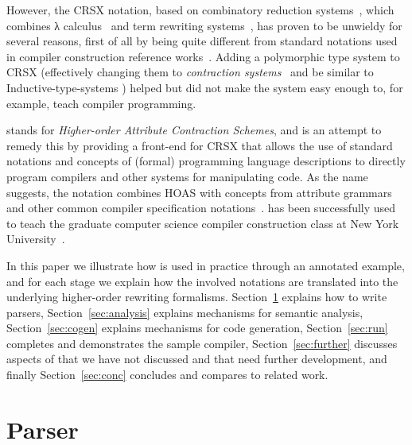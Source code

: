 \documentclass[letterpaper]{llncs}
\begin{document}
However, the CRSX notation, based on combinatory reduction systems~\cite{Klop:1980,Klop+:tcs1993},
which combines λ calculus~\cite{Church:1941,Barendregt:1984} and term rewriting
systems~\cite{Klop:1992:Handbook}, has proven to be unwieldy for several reasons, first of all by
being quite different from standard notations used in compiler construction reference
works~\cite{Aho+:2006}. Adding a polymorphic type system to CRSX (effectively changing them to
\emph{contraction systems}~\cite{Aczel:1978} and be similar to Inductive-type-systems
\cite{BlanquiJouannaudOkada:tcs2002}) helped but did not make the system easy enough to, for
example, teach compiler programming.

\HAX stands for \emph{Higher-order Attribute Contraction Schemes}, and is an attempt to remedy this
by providing a front-end for CRSX that allows the use of standard notations and concepts of (formal)
programming language descriptions to directly program compilers and other systems for manipulating
code. As the name suggests, the notation combines HOAS with concepts from attribute
grammars~\cite{Knuth:mst1968} and other common compiler specification
notations~\cite{Aho+:2006}. \HAX has been successfully used to teach the graduate computer science
compiler construction class at New York University~\cite{RoseRose:cims2015}.

In this paper we illustrate how \HAX is used in practice through an annotated example, and for each
stage we explain how the involved \HAX notations are translated into the underlying higher-order
rewriting formalisms.
Section~\ref{sec:parse} explains how to write parsers, %
Section~\ref{sec:analysis} explains mechanisms for semantic analysis, %
Section~\ref{sec:cogen} explains mechanisms for code generation, %
Section~\ref{sec:run} completes and demonstrates the sample compiler, %
Section~\ref{sec:further} discusses aspects of \HAX that we have not discussed and that need further
development, %
and finally Section~\ref{sec:conc} concludes and compares to related work.


\section{Parser}
\label{sec:parse}
\end{document}
